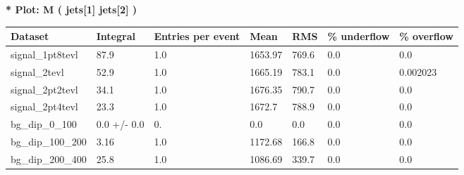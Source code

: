\documentclass[a4paper, 10pt]{article}
\begin{document}
\textbf{* Plot: M ( jets[1] jets[2] ) }\\
   \begin{table}[H]
  \begin{center}
    \begin{tabular}{|m{23.0mm}|m{23.0mm}|m{18.0mm}|m{19.0mm}|m{19.0mm}|m{19.0mm}|m{19.0mm}|}
      \hline
      {\cellcolor{yellow}         Dataset}& {\cellcolor{yellow}         Integral}& {\cellcolor{yellow}         Entries per event}& {\cellcolor{yellow}         Mean}& {\cellcolor{yellow}         RMS}& {\cellcolor{yellow}         \% underflow}& {\cellcolor{yellow}         \% overflow}\\
      \hline
      {\cellcolor{white}         signal\_1pt8tevl}& {\cellcolor{white}         87.9}& {\cellcolor{white}         1.0}& {\cellcolor{white}         1653.97}& {\cellcolor{white}         769.6}& {\cellcolor{green}         0.0}& {\cellcolor{green}         0.0}\\
      \hline
      {\cellcolor{white}         signal\_2tevl}& {\cellcolor{white}         52.9}& {\cellcolor{white}         1.0}& {\cellcolor{white}         1665.19}& {\cellcolor{white}         783.1}& {\cellcolor{green}         0.0}& {\cellcolor{green}         0.002023}\\
      \hline
      {\cellcolor{white}         signal\_2pt2tevl}& {\cellcolor{white}         34.1}& {\cellcolor{white}         1.0}& {\cellcolor{white}         1676.35}& {\cellcolor{white}         790.7}& {\cellcolor{green}         0.0}& {\cellcolor{green}         0.0}\\
      \hline
      {\cellcolor{white}         signal\_2pt4tevl}& {\cellcolor{white}         23.3}& {\cellcolor{white}         1.0}& {\cellcolor{white}         1672.7}& {\cellcolor{white}         788.9}& {\cellcolor{green}         0.0}& {\cellcolor{green}         0.0}\\
      \hline
      {\cellcolor{white}         bg\_dip\_0\_100}& {\cellcolor{white}         0.0 +/\-- 0.0}& {\cellcolor{white}         0.}& {\cellcolor{white}         0.0}& {\cellcolor{white}         0.0}& {\cellcolor{green}         0.0}& {\cellcolor{green}         0.0}\\
      \hline
      {\cellcolor{white}         bg\_dip\_100\_200}& {\cellcolor{white}         3.16}& {\cellcolor{white}         1.0}& {\cellcolor{white}         1172.68}& {\cellcolor{white}         166.8}& {\cellcolor{green}         0.0}& {\cellcolor{green}         0.0}\\
      \hline
      {\cellcolor{white}         bg\_dip\_200\_400}& {\cellcolor{white}         25.8}& {\cellcolor{white}         1.0}& {\cellcolor{white}         1086.69}& {\cellcolor{white}         339.7}& {\cellcolor{green}         0.0}& {\cellcolor{green}         0.0}\\

\end{tabular}
\end{center}
\end{table}
\end{document}
